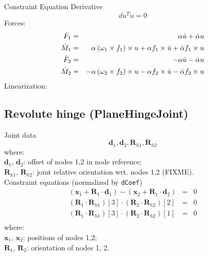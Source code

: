 \documentclass[10pt,dvips]{report}
\newcommand{\T}[1]{\boldsymbol{#1}}
\begin{document}
Constraint Equation Derivative
\begin{displaymath}
	d u^T\dot{u} = 0
\end{displaymath}
Forces:
\begin{eqnarray*}
	\dot{F}_1 & = &  \alpha \dot{u} + \dot{\alpha} u \\
	\dot{M}_1 & = & \alpha \left( \omega_1\times{f_1} \right) \times u 
		+ \alpha f_1 \times \dot{u}
		+ \dot{\alpha} f_1 \times u \\
	\dot{F}_2 & = & -\alpha \dot{u} - \dot{\alpha} u \\
	\dot{M}_2 & = & -\alpha \left( \omega_2 \times{f_2} \right) \times u
		- \alpha f_2 \times \dot{u}
		- \dot{\alpha} f_2 \times u
\end{eqnarray*}
Linearization:





\subsection{Revolute hinge (PlaneHingeJoint)}
Joint data
\begin{displaymath}
\T d_1, \T d_2, \T R_{h1}, \T R_{h2}
\end{displaymath}
where:\\
$\T d_1$, $\T d_2$: offset of nodes 1,2 in node reference;\\
$\T R_{h1}$, $\T R_{h2}$: joint relative orientation wrt. nodes 1,2 (FIXME).\\

\noindent
Constraint equations (normalized by \texttt{dCoef})
\begin{eqnarray*}
	(\T x_1+\T R_1\cdot \T d_1) - (\T x_2+\T R_1\cdot \T d_2)& = & 0 \\
	(\T R_1\cdot \T R_{h1})[3]\cdot (\T R_2\cdot \T R_{h2})[2] & = & 0 \\
	(\T R_1\cdot \T R_{h1})[3]\cdot (\T R_2\cdot \T R_{h2})[1] & = & 0 \\
\end{eqnarray*}
where:\\
$\T x_1$, $\T x_2$: positions of nodes 1,2;\\
$\T R_{1}$, $\T R_{2}$: orientation of nodes 1, 2.\\
\end{document}
